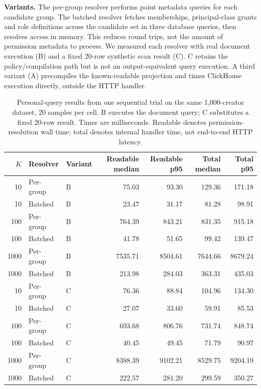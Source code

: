 \documentclass[sigconf, nonacm]{acmart}
\begin{document}
\textbf{Variants.} The per-group resolver performs point metadata queries for
each candidate group. The batched resolver fetches memberships, principal-class
grants and role definitions across the candidate set in three database queries,
then resolves access in memory. This reduces round trips, not the amount of
permission metadata to process. We measured each resolver with real document
execution (B) and a fixed 20-row synthetic scan result (C). C retains the
policy/compilation path but is not an output-equivalent query execution.
A third variant (A) precompiles the known-readable projection and times
ClickHouse execution directly, outside the HTTP handler.

\begin{table}[t]
\centering
\small
\caption{Personal-query results from one sequential trial on the same
1,000-creator dataset, 20 samples per cell. B executes the document query; C substitutes a fixed
20-row result. Times are milliseconds. Readable denotes permission-resolution
wall time; total denotes internal handler time, not end-to-end HTTP latency.}
\label{tab:fanout}
\begin{tabular}{@{}rllrrrr@{}}
\toprule
$K$ & Resolver & Variant & Readable median & Readable p95 & Total median & Total p95 \\
\midrule
10 & Per-group & B & 75.03 & 93.30 & 129.36 & 171.18 \\
10 & Batched   & B & 23.47 & 31.17 & 81.28 & 98.91 \\
100 & Per-group & B & 764.39 & 843.21 & 831.35 & 915.18 \\
100 & Batched   & B & 41.78 & 51.65 & 99.42 & 139.47 \\
1000 & Per-group & B & 7535.71 & 8504.61 & 7644.66 & 8679.24 \\
1000 & Batched   & B & 213.98 & 284.03 & 363.31 & 435.03 \\
\midrule
10 & Per-group & C & 76.36 & 88.84 & 104.96 & 134.30 \\
10 & Batched   & C & 27.07 & 33.60 & 59.91 & 85.53 \\
100 & Per-group & C & 693.68 & 806.76 & 731.74 & 848.74 \\
100 & Batched   & C & 40.45 & 49.45 & 71.79 & 90.97 \\
1000 & Per-group & C & 8388.39 & 9102.21 & 8529.75 & 9204.19 \\
1000 & Batched   & C & 222.57 & 281.20 & 299.59 & 350.27 \\
\bottomrule
\end{tabular}
\end{table}
\end{document}
